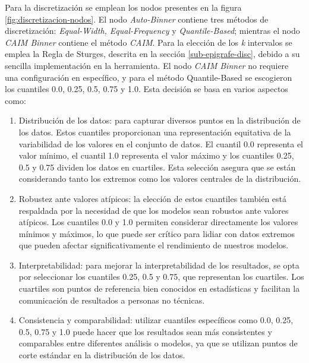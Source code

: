 Para la discretización se emplean los nodos presentes en la figura \ref{fig:discretizacion-nodos}. El nodo \textit{Auto-Binner} contiene tres métodos de discretización: \textit{Equal-Width, Equal-Frequency} y \textit{Quantile-Based}; mientras el nodo \textit{CAIM Binner} contiene el método \textit{CAIM}. Para la elección de los \textit{k} intervalos se emplea la Regla de Sturges, descrita en la sección \ref{sub-epigrafe-disc}, debido a su sencilla implementación en la herramienta. El nodo \textit{CAIM Binner} no requiere una configuración en específico, y para el método Quantile-Based se escogieron los cuantiles 0.0, 0.25, 0.5, 0.75 y 1.0. Esta decisión se basa en varios aspectos como:
\begin{enumerate}
	\item Distribución de los datos: para capturar diversos puntos en la distribución de los datos. Estos cuantiles proporcionan una representación equitativa de la variabilidad de los valores en el conjunto de datos. El cuantil 0.0 representa el valor mínimo, el cuantil 1.0 representa el valor máximo y los cuantiles 0.25, 0.5 y 0.75 dividen los datos en cuartiles. Esta selección asegura que se están considerando tanto los extremos como los valores centrales de la distribución.
	\item Robustez ante valores atípicos: la elección de estos cuantiles también está respaldada por la necesidad de que los modelos sean robustos ante valores atípicos. Los cuantiles 0.0 y 1.0 permiten considerar directamente los valores mínimos y máximos, lo que puede ser crítico para lidiar con datos extremos que pueden afectar significativamente el rendimiento de nuestros modelos.
	\item Interpretabilidad: para mejorar la interpretabilidad de los resultados, se opta por seleccionar los cuantiles 0.25, 0.5 y 0.75, que representan los cuartiles. Los cuartiles son puntos de referencia bien conocidos en estadísticas y facilitan la comunicación de resultados a personas no técnicas. 
	\item Consistencia y comparabilidad: utilizar cuantiles específicos como 0.0, 0.25, 0.5, 0.75 y 1.0 puede hacer que los resultados sean más consistentes y comparables entre diferentes análisis o modelos, ya que se utilizan puntos de corte estándar en la distribución de los datos.
\end{enumerate}

